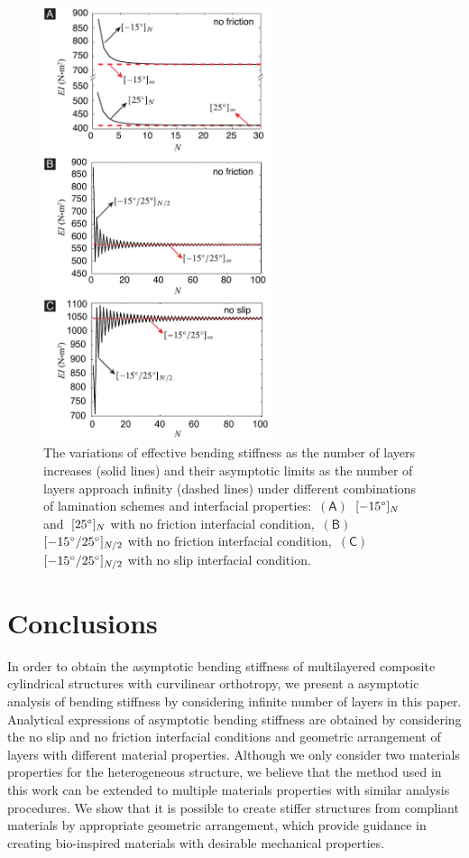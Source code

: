 \documentclass[preprint,10pt,times]{elsarticle}
\numberwithin{equation}{section}
\newcommand{\pr}[1]{\left( #1 \right)}
\newcommand{\subf}[1]{\pr{\textsf{#1}}}
\renewcommand{\>}{$\Rightarrow$}
\begin{document}
\begin{figure}[h!]
	\centering
	\graphicspath{{./figure/}}
	\includegraphics[width=0.6\textwidth]{combined_EI.pdf}
	\caption{The variations of effective bending stiffness as the number of layers increases (solid lines) and their asymptotic limits as the number of layers approach infinity (dashed lines) under different combinations of lamination schemes and interfacial properties:~$\subf{A}$~$[-15 \degree]_N$ and~$[25 \degree]_N$ with no friction interfacial condition,~$\subf{B}$~$[-15 \degree/ 25 \degree]_{N/2}$ with no friction interfacial condition,~$\subf{C}$~$[-15 \degree/25 \degree]_{N/2}$ with no slip interfacial condition.}
	\label{fig:asymptotic_EI}
\end{figure}

\section{Conclusions}
\label{sec:conclusion}
In order to obtain the asymptotic bending stiffness of multilayered composite cylindrical structures with curvilinear orthotropy, we present a asymptotic analysis of bending stiffness by considering infinite number of layers in this paper.
Analytical expressions of asymptotic bending stiffness are obtained by considering the no slip and no friction interfacial conditions and geometric arrangement of layers with different material properties.
Although we only consider two materials properties for the heterogeneous structure, we believe that the method used in this work can be extended to multiple materials properties with similar analysis procedures.
We show that it is possible to create stiffer structures from compliant materials by appropriate geometric arrangement, which provide guidance in creating bio-inspired materials with desirable mechanical properties.
\end{document}
